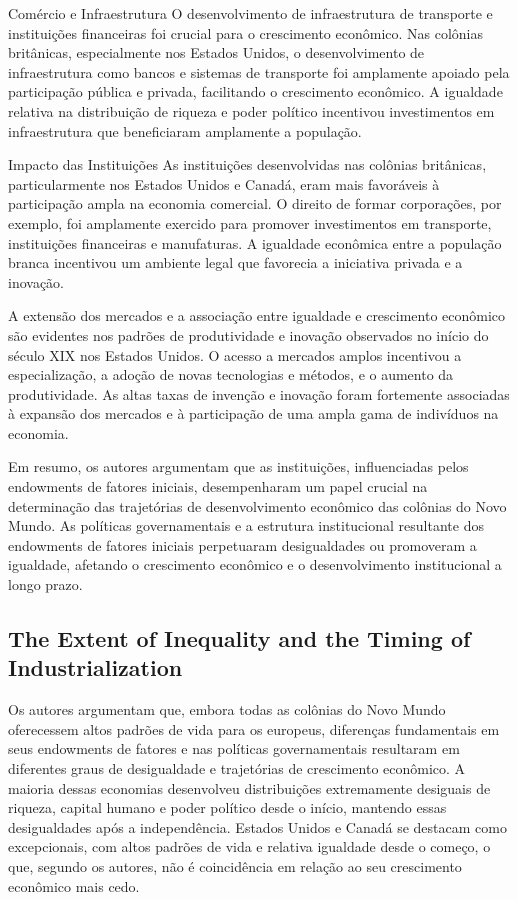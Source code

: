 \documentclass[a4paper,12pt]{article}[abntex2]
\begin{document}
Comércio e Infraestrutura
O desenvolvimento de infraestrutura de transporte e instituições financeiras foi crucial para o crescimento econômico. Nas colônias britânicas, especialmente nos Estados Unidos, o desenvolvimento de infraestrutura como bancos e sistemas de transporte foi amplamente apoiado pela participação pública e privada, facilitando o crescimento econômico. A igualdade relativa na distribuição de riqueza e poder político incentivou investimentos em infraestrutura que beneficiaram amplamente a população.

Impacto das Instituições
As instituições desenvolvidas nas colônias britânicas, particularmente nos Estados Unidos e Canadá, eram mais favoráveis à participação ampla na economia comercial. O direito de formar corporações, por exemplo, foi amplamente exercido para promover investimentos em transporte, instituições financeiras e manufaturas. A igualdade econômica entre a população branca incentivou um ambiente legal que favorecia a iniciativa privada e a inovação.

A extensão dos mercados e a associação entre igualdade e crescimento econômico são evidentes nos padrões de produtividade e inovação observados no início do século XIX nos Estados Unidos. O acesso a mercados amplos incentivou a especialização, a adoção de novas tecnologias e métodos, e o aumento da produtividade. As altas taxas de invenção e inovação foram fortemente associadas à expansão dos mercados e à participação de uma ampla gama de indivíduos na economia.

Em resumo, os autores argumentam que as instituições, influenciadas pelos endowments de fatores iniciais, desempenharam um papel crucial na determinação das trajetórias de desenvolvimento econômico das colônias do Novo Mundo. As políticas governamentais e a estrutura institucional resultante dos endowments de fatores iniciais perpetuaram desigualdades ou promoveram a igualdade, afetando o crescimento econômico e o desenvolvimento institucional a longo prazo.

\subsection*{\textbf{The Extent of Inequality and the Timing of Industrialization}}

Os autores argumentam que, embora todas as colônias do Novo Mundo oferecessem altos padrões de vida para os europeus, diferenças fundamentais em seus endowments de fatores e nas políticas governamentais resultaram em diferentes graus de desigualdade e trajetórias de crescimento econômico. A maioria dessas economias desenvolveu distribuições extremamente desiguais de riqueza, capital humano e poder político desde o início, mantendo essas desigualdades após a independência. Estados Unidos e Canadá se destacam como excepcionais, com altos padrões de vida e relativa igualdade desde o começo, o que, segundo os autores, não é coincidência em relação ao seu crescimento econômico mais cedo.
\end{document}
